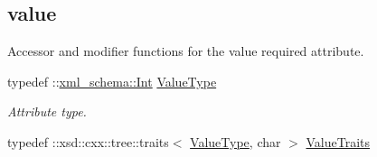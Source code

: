 \subsection*{value}
\label{_amgrp2063c1608d6e0baf80249c42e2be5804}
Accessor and modifier functions for the value required attribute. \begin{DoxyCompactItemize}
\item 
\hypertarget{classopenstack_1_1xml_1_1AbsoluteLimit_ade5fbfd6ef570b66c9ad22f8339ef3f6}{
typedef ::\hyperlink{namespacexml__schema_a12d975a13061c938969b2b5143e97645}{xml\_\-schema::Int} \hyperlink{classopenstack_1_1xml_1_1AbsoluteLimit_ade5fbfd6ef570b66c9ad22f8339ef3f6}{ValueType}}
\label{classopenstack_1_1xml_1_1AbsoluteLimit_ade5fbfd6ef570b66c9ad22f8339ef3f6}

\begin{DoxyCompactList}\small\item\em Attribute type. \item\end{DoxyCompactList}\item 
\hypertarget{classopenstack_1_1xml_1_1AbsoluteLimit_a1005b316032a1067933ada311467455a}{
typedef ::xsd::cxx::tree::traits$<$ \hyperlink{classopenstack_1_1xml_1_1AbsoluteLimit_ade5fbfd6ef570b66c9ad22f8339ef3f6}{ValueType}, char $>$ \hyperlink{classopenstack_1_1xml_1_1AbsoluteLimit_a1005b316032a1067933ada311467455a}{ValueTraits}}
\label{classopenstack_1_1xml_1_1AbsoluteLimit_a1005b316032a1067933ada311467455a}


\end{DoxyCompactItemize}

